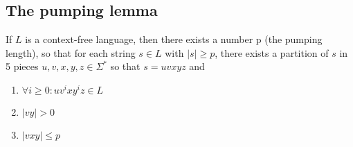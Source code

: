 \subsection{The pumping lemma}
\begin{theorem}
If $L$ is a context-free language, then there exists a number p (the
pumping length), so that for each string $s \in L$ with $|s| \geq p$,
there exists a partition of $s$ in 5 pieces $u,v,x,y,z\in \Sigma^*$ so that $s = uvxyz$ and
\begin{enumerate}
	\item $\forall i \geq 0: uv^ixy^iz \in L$
	\item $|vy| > 0$
	\item $|vxy| \leq p$
\end{enumerate}
\end{theorem}
